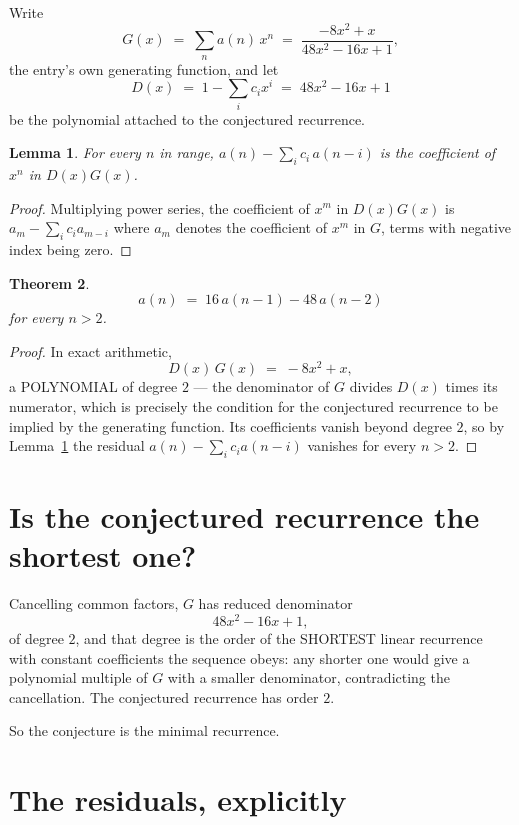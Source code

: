 \documentclass[11pt,a4paper]{article}
\theoremstyle{plain}
\newtheorem{theorem}{Theorem}
\newtheorem{lemma}[theorem]{Lemma}
\theoremstyle{definition}
\begin{document}
Write
\[
G(x)\;=\;\sum_{n}a(n)\,x^{n}\;=\;\frac{- 8 x^{2} + x}{48 x^{2} - 16 x + 1},
\]
the entry's own generating function, and let
\[
D(x)\;=\;1-\sum_i c_i x^{i}\;=\;48 x^{2} - 16 x + 1
\]
be the polynomial attached to the conjectured recurrence.

\begin{lemma}\label{lem:key}
For every $n$ in range, $a(n)-\sum_i c_i\,a(n-i)$ is the coefficient of $x^{n}$ in
$D(x)G(x)$.
\end{lemma}

\begin{proof}
Multiplying power series, the coefficient of $x^{m}$ in $D(x)G(x)$ is
$a_m-\sum_i c_i a_{m-i}$ where $a_m$ denotes the coefficient of $x^{m}$ in $G$, terms with
negative index being zero.
\end{proof}

\begin{theorem}
\[
a(n)\;=\;16\,a(n-1) - 48\,a(n-2)
\]
for every $n>2$.
\end{theorem}

\begin{proof}
In exact arithmetic,
\[
D(x)\,G(x)\;=\;- 8 x^{2} + x,
\]
a POLYNOMIAL of degree $2$ --- the denominator of $G$ divides $D(x)$ times its numerator,
which is precisely the condition for the conjectured recurrence to be implied by the
generating function. Its coefficients vanish beyond degree $2$, so by
Lemma~\ref{lem:key} the residual $a(n)-\sum_ic_ia(n-i)$ vanishes for every
$n>2$.
\end{proof}

\section{Is the conjectured recurrence the shortest one?}

Cancelling common factors, $G$ has reduced denominator
\[
48 x^{2} - 16 x + 1,
\]
of degree $2$, and that degree is the order of the SHORTEST linear recurrence with
constant coefficients the sequence obeys: any shorter one would give a polynomial multiple of
$G$ with a smaller denominator, contradicting the cancellation. The conjectured recurrence has
order $2$.

So the conjecture is the minimal recurrence.

\section{The residuals, explicitly}
\end{document}
